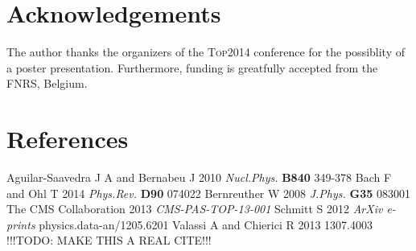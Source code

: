 \documentclass[a4paper]{jpconf}
\begin{document}
\section{Acknowledgements}
The author thanks the organizers of the \textsc{Top2014} conference for the possiblity of a poster presentation. Furthermore, funding is greatfully accepted from the FNRS, Belgium.


\section*{References}
\begin{thebibliography}{7}
 Aguilar-Saavedra J A and Bernabeu J 2010 {\it Nucl.Phys.} {\bf B840} 349-378 
 Bach F and Ohl T 2014 {\it Phys.Rev.} {\bf D90} 074022 
 Bernreuther W 2008 {\it J.Phys.} {\bf G35} 083001 
 The CMS Collaboration 2013 {\it CMS-PAS-TOP-13-001}
 Schmitt S 2012 {\it ArXiv e-prints} physics.data-an/1205.6201
 Valassi A and Chierici R 2013 1307.4003 !!!TODO: MAKE THIS A REAL CITE!!!
\end{thebibliography}
\end{document}
